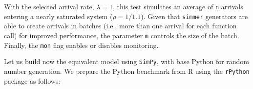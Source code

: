 \documentclass[twoside,nohyper]{tufte-book}
\newenvironment{Shaded}{}{}
\newcommand{\KeywordTok}[1]{\textcolor[rgb]{0.00,0.44,0.13}{\textbf{#1}}}
\newcommand{\DataTypeTok}[1]{\textcolor[rgb]{0.56,0.13,0.00}{#1}}
\newcommand{\DecValTok}[1]{\textcolor[rgb]{0.25,0.63,0.44}{#1}}
\newcommand{\FloatTok}[1]{\textcolor[rgb]{0.25,0.63,0.44}{#1}}
\newcommand{\StringTok}[1]{\textcolor[rgb]{0.25,0.44,0.63}{#1}}
\newcommand{\OtherTok}[1]{\textcolor[rgb]{0.00,0.44,0.13}{#1}}
\newcommand{\ControlFlowTok}[1]{\textcolor[rgb]{0.00,0.44,0.13}{\textbf{#1}}}
\newcommand{\OperatorTok}[1]{\textcolor[rgb]{0.40,0.40,0.40}{#1}}
\newcommand{\NormalTok}[1]{#1}
\theoremstyle{definition}
\theoremstyle{definition}
\theoremstyle{definition}
\theoremstyle{remark}
\begin{document}
\begin{Shaded}
\end{Shaded}

With the selected arrival rate, \(\lambda=1\), this test simulates an
average of \texttt{n} arrivals entering a nearly saturated system
(\(\rho=1/1.1\)). Given that \texttt{simmer} generators are able to
create arrivals in batches (i.e., more than one arrival for each
function call) for improved performance, the parameter \texttt{m}
controls the size of the batch. Finally, the \texttt{mon} flag enables
or disables monitoring.

Let us build now the equivalent model using \texttt{SimPy}, with base
Python for random number generation. We prepare the Python benchmark
from R using the \texttt{rPython}
package\cite[0pt]{CRAN:rPython}
as follows:
\end{document}
